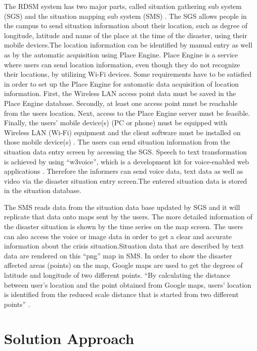 The RDSM system has  two major  parts, called situation gathering sub system (SGS) and the situation mapping sub system (SMS) \cite{}. The SGS allows people in the campus to send situation information about their location, such as degree of longitude, latitude and name of the place at the time of the disaster, using their mobile devices.The location information can be identified by manual entry as well as by the automatic acquisition using Place Engine. Place Engine is a service where users can send location information, even though they do not recognize their locations, by utilizing Wi-Fi devices. Some requirements have to be satisfied in order to set up the Place Engine for automatic data acquisition of location information. First, the Wireless LAN access point data must be saved in the Place Engine database. Secondly, at least one access point must be reachable from the users  location. Next, access to the Place Engine server must be feasible. Finally,  the users’ mobile device(s) (PC or phone) must be equipped with Wireless LAN (Wi-Fi) equipment and the client software must be installed on those mobile device(s) \cite{}. The users can send situation information from the situation data entry screen by accessing the SGS. Speech to text transformation is achieved by using “w3voice”, which is a development kit for voice-enabled web applications \cite{}. Therefore the informers can send voice data, text data as well as video via the disaster situation entry screen.The entered situation data is stored in the situation database. 

The SMS reads data from the situation data base updated by SGS and it will replicate that data onto maps sent by the users. The more detailed information of the disaster situation is shown by the time series on the map screen. The users can also access the voice or image data  in order to get a clear and accurate information about the crisis situation.Situation data that are described by text data are rendered on this “png” map in SMS. In order to show the disaster affected areas (points) on the map, Google maps are used to get the degrees of latitude and longitude of two different points. “By calculating the distance between user’s location and the point obtained from Google maps, users’ location is identified from the reduced scale distance that is started from two different points” \cite{}.

\section{Solution Approach}

